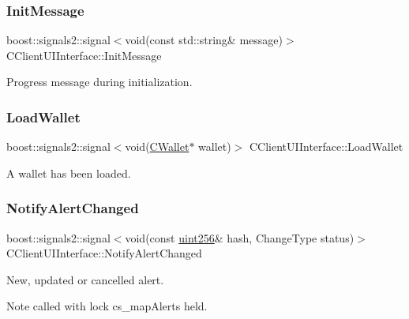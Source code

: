 \subsubsection{\texorpdfstring{Init\+Message}{InitMessage}}
{\footnotesize\ttfamily boost\+::signals2\+::signal$<$void(const std\+::string\& message)$>$ C\+Client\+U\+I\+Interface\+::\+Init\+Message}

Progress message during initialization. \mbox{\label{class_c_client_u_i_interface_ac3755a3740bc70e69d81d7905a57faa6}} 
\subsubsection{\texorpdfstring{Load\+Wallet}{LoadWallet}}
{\footnotesize\ttfamily boost\+::signals2\+::signal$<$void(\mbox{\hyperlink{class_c_wallet}{C\+Wallet}}$\ast$ wallet)$>$ C\+Client\+U\+I\+Interface\+::\+Load\+Wallet}

A wallet has been loaded. \mbox{\label{class_c_client_u_i_interface_ab633d1e727230ae86cae059dc4bc79f1}} 
\subsubsection{\texorpdfstring{Notify\+Alert\+Changed}{NotifyAlertChanged}}
{\footnotesize\ttfamily boost\+::signals2\+::signal$<$void(const \mbox{\hyperlink{classuint256}{uint256}}\& hash, Change\+Type status)$>$ C\+Client\+U\+I\+Interface\+::\+Notify\+Alert\+Changed}

New, updated or cancelled alert. \begin{DoxyNote}{Note}
called with lock cs\+\_\+map\+Alerts held. 
\end{DoxyNote}
\mbox{\label{class_c_client_u_i_interface_ab12afb3c938ce8754dcf5ee6ade4cc03}} 
